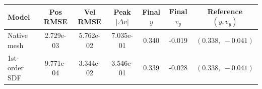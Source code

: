 \begin{tabular}{lcccccc}
\toprule
Model & Pos RMSE & Vel RMSE & Peak $|\Delta v|$ & Final $y$ & Final $v_y$ & Reference $(y, v_y)$ \\
\midrule
Native mesh & 2.729e-03 & 5.762e-02 & 7.035e-01 & 0.340 & -0.019 & $(0.338,\ -0.041)$ \\
1st-order SDF & 9.771e-04 & 3.344e-02 & 3.546e-01 & 0.339 & -0.028 & $(0.338,\ -0.041)$ \\
\bottomrule
\end{tabular}
